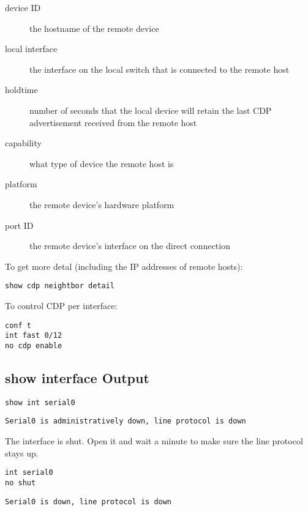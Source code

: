 \begin{description}

\item[device ID]
the hostname of the remote device

\item[local interface]
the interface on the local switch that is connected to the remote host

\item[holdtime]
number of seconds that the local device will retain the last CDP advertisement
received from the remote host

\item[capability]
what type of device the remote host is

\item[platform]
the remote device's hardware platform

\item[port ID]
the remote device's interface on the direct connection

\end{description}

To get more detal (including the IP addresses of remote hosts):

\begin{verbatim}
show cdp neightbor detail
\end{verbatim}

To control CDP per interface:

\begin{verbatim}
conf t
int fast 0/12
no cdp enable
\end{verbatim}

\subsection{show interface Output}

\begin{verbatim}
show int serial0
\end{verbatim}

\begin{verbatim}
Serial0 is administratively down, line protocol is down
\end{verbatim}

The interface is shut. Open it and wait a minute to make sure the line protocol
stays up.

\begin{verbatim}
int serial0
no shut
\end{verbatim}

\begin{verbatim}
Serial0 is down, line protocol is down
\end{verbatim}

